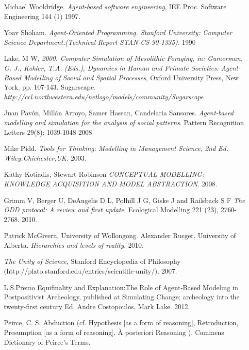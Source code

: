 \documentclass[11pt,oneside,a4paper,openright]{report}
\begin{document}
\begin{thebibliography}{49}
	 Michael Wooldridge.
	\emph{Agent-based software engineering}, IEE Proc. Software Engineering 144 (1) 
	1997.

	Yoav Shoham.
	\emph{Agent-Oriented Programming. Stanford University: Computer Science Department.(Technical Report STAN-CS-90-1335).}
	1990 

	Lake, M W,
	\emph{2000. Computer Simulation of Mesolithic Foraging, in: Gumerman, G. J., Kohler, T.A. (Eds.), Dynamics in Human and Primate Societies: Agent-Based Modelling of Social and Spatial Processes}, Oxford University Press, New York, pp. 107-143.
	Sugarscape.
	\emph{http://ccl.northwestern.edu/netlogo/models/community/Sugarscape}

	Juan Pavón, Millán Arroyo, Samer Hassan, Candelaria Sansores.
	\emph{Agent-based modelling and simulation for the analysis of social patterns}. Pattern Recognition Letters 29(8): 1039-1048 
	2008

	Mike Pidd.
	\emph{Tools for Thinking: Modelling in Management Science, 2nd Ed. Wiley.Chichester,UK}.
	2003.

	Kathy Kotiadis, Stewart Robinson
	\emph{CONCEPTUAL MODELLING: KNOWLEDGE ACQUISITION AND MODEL ABSTRACTION}.
	2008.

	Grimm V, Berger U, DeAngelis D L, Polhill J G, Giske J and Railsback S F 
	\emph{The ODD protocol: A review and first update}. 
	Ecological Modelling 221 (23), 2760-2768.
	2010. 
	

	Patrick McGivern, University of Wollongong.
	Alexander Rueger, University of Alberta.
	\emph{Hierarchies and levels of reality}.
	2010.

	\emph{The Unity of Science}, Stanford Encyclopedia of Philosophy 
	(http://plato.stanford.edu/entries/scientific-unity/).
	2007.

	L.S.Premo
	Equifinality and Explanation:The Role of Agent-Based Modeling in Postpositivist Archeology, 
	published at Simulating Change; archeology into the twenty-first century Ed. Andre Costopoulos, Mark Lake.
	2012.

	Peirce, C. S. 
	Abduction (cf. Hypothesis [as a form of reasoning], Retroduction, Presumption [as a form of reasoning], À posteriori Reasoning ). Commens Dictionary of Peirce's Terms.
	

\end{thebibliography}
\end{document}
